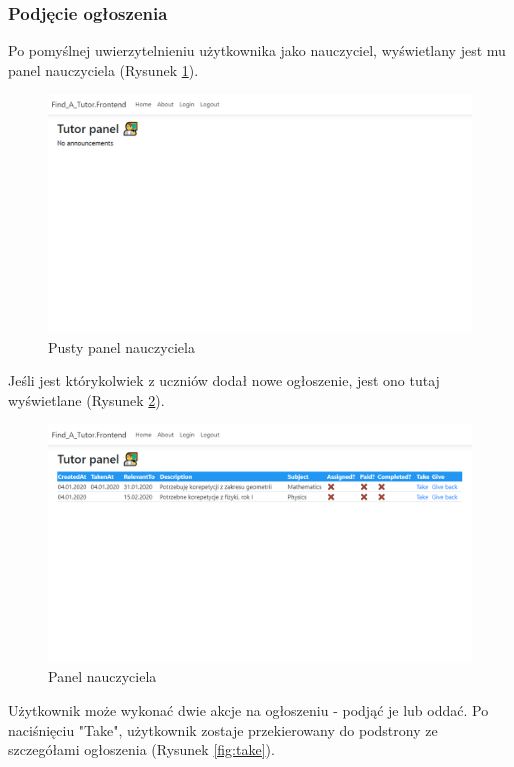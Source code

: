 \documentclass[12pt]{article}
\numberwithin{figure}{section}
\begin{document}
\begin{sloppypar}
\subsubsection{Podjęcie ogłoszenia}
Po pomyślnej uwierzytelnieniu użytkownika jako nauczyciel, wyświetlany jest mu panel nauczyciela (Rysunek \ref{fig:tutor-empty}).
\begin{figure}[H] 
    \centering
    \includegraphics[width=1\textwidth]{images/chapter_4/tutor-empty.png}
    \caption{Pusty panel nauczyciela}
    \label{fig:tutor-empty}
\end{figure}

Jeśli jest którykolwiek z uczniów dodał nowe ogłoszenie, jest ono tutaj wyświetlane (Rysunek \ref{fig:tutor}).
\begin{figure}[H] 
    \centering
    \includegraphics[width=1\textwidth]{images/chapter_4/tutor.png}
    \caption{Panel nauczyciela}
    \label{fig:tutor}
\end{figure}
Użytkownik może wykonać dwie akcje na ogłoszeniu - podjąć je lub oddać. Po naciśnięciu "Take", użytkownik zostaje przekierowany do podstrony ze szczegółami ogłoszenia (Rysunek \ref{fig:take}).


\end{sloppypar}
\end{document}
